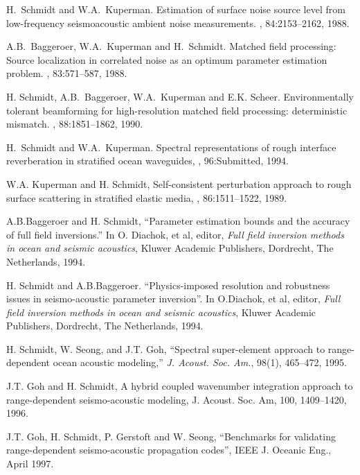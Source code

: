 \begin{thebibliography}{1}
H.~Schmidt and W.A.~Kuperman.
\newblock Estimation of surface noise source level from low-frequency
seismoacoustic ambient noise measurements. 
, 84:2153--2162, 1988.

A.B.~Baggeroer, W.A.~Kuperman and H.~Schmidt.
\newblock Matched field processing: Source localization in correlated
noise as an optimum parameter estimation problem.
, 83:571--587, 1988.

H. Schmidt, A.B.~Baggeroer, W.A.~Kuperman and E.K. Scheer. 
\newblock Environmentally tolerant beamforming for high-resolution
matched field processing: deterministic mismatch.
, 88:1851--1862, 1990.

H.~Schmidt and W.A.~Kuperman.
\newblock Spectral representations of rough interface reverberation in stratified ocean waveguides,
, 96:Submitted, 1994.

W.A. Kuperman and H. Schmidt,
\newblock Self-consistent perturbation approach to rough surface scattering in stratified elastic media,
, 86:1511--1522, 1989.

 A.B.Baggeroer and H. Schmidt, ``Parameter estimation bounds and
the accuracy of full field inversions.'' In O. Diachok, et al, editor,
{\em Full field inversion methods in ocean and seismic acoustics},
Kluwer Academic Publishers, Dordrecht, The Netherlands, 1994.

H. Schmidt and A.B.Baggeroer.  ``Physics-imposed resolution and
robustness issues in seismo-acoustic parameter inversion''.  In
O.Diachok, et al, editor, {\em Full field inversion methods in ocean
and seismic acoustics}, Kluwer Academic Publishers, Dordrecht, The
Netherlands, 1994.

 H. Schmidt, W. Seong, and J.T. Goh, ``Spectral super-element
approach to range-dependent ocean acoustic modeling,'' {\em J. Acoust.
Soc. Am.}, 98(1), 465--472, 1995.


J.T. Goh and H. Schmidt, A hybrid coupled wavenumber integration
approach to range-dependent seismo-acoustic modeling,
J. Acoust. Soc. Am, 100, 1409--1420, 1996.

J.T. Goh, H. Schmidt, P. Gerstoft and W. Seong, ``Benchmarks
for validating range-dependent seismo-acoustic propagation codes'', IEEE
J. Oceanic Eng., April 1997.


\end{thebibliography}
